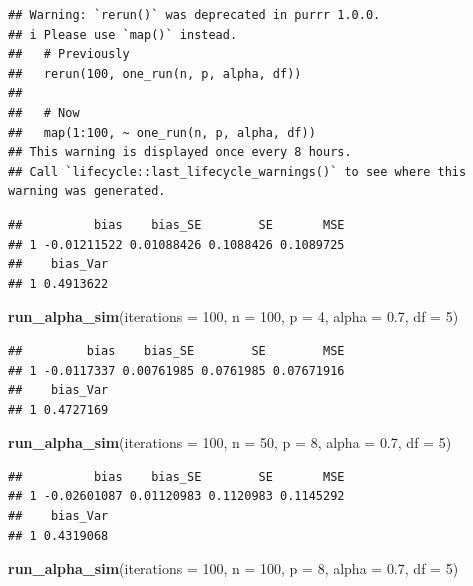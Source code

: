 \documentclass[
]{book}
\newenvironment{Shaded}{\begin{snugshade}}{\end{snugshade}}
\newcommand{\AttributeTok}[1]{\textcolor[rgb]{0.13,0.29,0.53}{#1}}
\newcommand{\DecValTok}[1]{\textcolor[rgb]{0.00,0.00,0.81}{#1}}
\newcommand{\FloatTok}[1]{\textcolor[rgb]{0.00,0.00,0.81}{#1}}
\newcommand{\FunctionTok}[1]{\textcolor[rgb]{0.13,0.29,0.53}{\textbf{#1}}}
\newcommand{\NormalTok}[1]{#1}
\begin{document}
\begin{verbatim}
## Warning: `rerun()` was deprecated in purrr 1.0.0.
## i Please use `map()` instead.
##   # Previously
##   rerun(100, one_run(n, p, alpha, df))
## 
##   # Now
##   map(1:100, ~ one_run(n, p, alpha, df))
## This warning is displayed once every 8 hours.
## Call `lifecycle::last_lifecycle_warnings()` to see where this warning was generated.
\end{verbatim}

\begin{verbatim}
##          bias    bias_SE        SE       MSE
## 1 -0.01211522 0.01088426 0.1088426 0.1089725
##    bias_Var
## 1 0.4913622
\end{verbatim}

\begin{Shaded}
\begin{Highlighting}[]
\FunctionTok{run\_alpha\_sim}\NormalTok{(}\AttributeTok{iterations =} \DecValTok{100}\NormalTok{, }\AttributeTok{n =} \DecValTok{100}\NormalTok{, }\AttributeTok{p =} \DecValTok{4}\NormalTok{, }\AttributeTok{alpha =} \FloatTok{0.7}\NormalTok{, }\AttributeTok{df =} \DecValTok{5}\NormalTok{)}
\end{Highlighting}
\end{Shaded}

\begin{verbatim}
##         bias    bias_SE        SE        MSE
## 1 -0.0117337 0.00761985 0.0761985 0.07671916
##    bias_Var
## 1 0.4727169
\end{verbatim}

\begin{Shaded}
\begin{Highlighting}[]
\FunctionTok{run\_alpha\_sim}\NormalTok{(}\AttributeTok{iterations =} \DecValTok{100}\NormalTok{, }\AttributeTok{n =} \DecValTok{50}\NormalTok{, }\AttributeTok{p =} \DecValTok{8}\NormalTok{, }\AttributeTok{alpha =} \FloatTok{0.7}\NormalTok{, }\AttributeTok{df =} \DecValTok{5}\NormalTok{)}
\end{Highlighting}
\end{Shaded}

\begin{verbatim}
##          bias    bias_SE        SE       MSE
## 1 -0.02601087 0.01120983 0.1120983 0.1145292
##    bias_Var
## 1 0.4319068
\end{verbatim}

\begin{Shaded}
\begin{Highlighting}[]
\FunctionTok{run\_alpha\_sim}\NormalTok{(}\AttributeTok{iterations =} \DecValTok{100}\NormalTok{, }\AttributeTok{n =} \DecValTok{100}\NormalTok{, }\AttributeTok{p =} \DecValTok{8}\NormalTok{, }\AttributeTok{alpha =} \FloatTok{0.7}\NormalTok{, }\AttributeTok{df =} \DecValTok{5}\NormalTok{)}
\end{Highlighting}
\end{Shaded}
\end{document}
